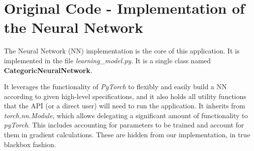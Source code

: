 \documentclass[a4paper, 11pt]{report}
\begin{document}
   \section{Original Code - Implementation of the Neural Network}\label{Implementation: NN}
   The Neural Network (NN) implementation is the core of this application. It is implemented in the file \textit{learning\_model.py}. It is a single class named \textbf{CategoricNeuralNetwork}.

   It leverages the functionality of \textit{PyTorch} to flexibly and easily build a NN according to given high-level specifications, and it also holds all utility functions that the API (or a direct user) will need to run the application. It inherits from \textit{torch.nn.Module}, which allows delegating a significant amount of functionality to \textit{pyTorch}. This includes accounting for parameters to be trained and account for them in gradient calculations. These are hidden from our implementation, in true blackbox fashion.
\end{document}
